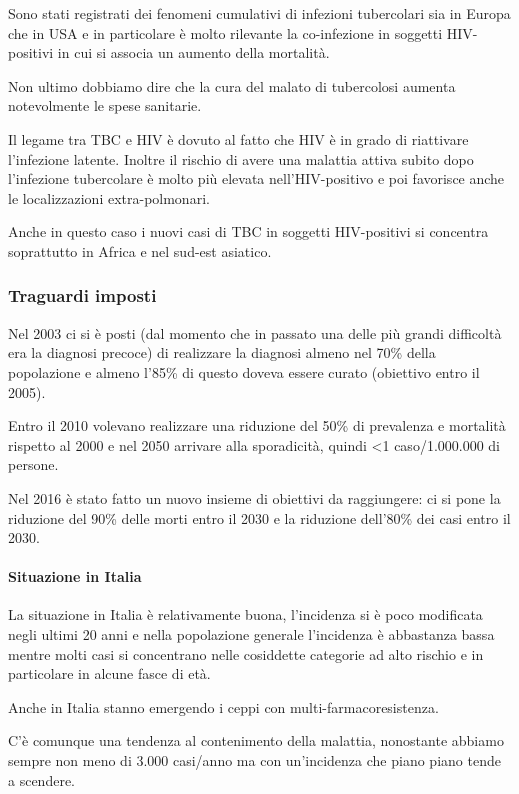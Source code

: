 Sono stati registrati dei fenomeni cumulativi di infezioni tubercolari
sia in Europa che in USA e in particolare è molto rilevante la
co-infezione in soggetti HIV-positivi in cui si associa un aumento della
mortalità.

Non ultimo dobbiamo dire che la cura del malato di tubercolosi aumenta
notevolmente le spese sanitarie.

Il legame tra TBC e HIV è dovuto al fatto che HIV è in grado di
riattivare l'infezione latente. Inoltre il rischio di avere una malattia
attiva subito dopo l'infezione tubercolare è molto più elevata
nell'HIV-positivo e poi favorisce anche le localizzazioni
extra-polmonari.

Anche in questo caso i nuovi casi di TBC in soggetti HIV-positivi si
concentra soprattutto in Africa e nel sud-est asiatico.

\subsubsection{Traguardi imposti}


Nel 2003 ci si è posti (dal momento che in passato una delle più grandi
difficoltà era la diagnosi precoce) di realizzare la diagnosi almeno nel
70\% della popolazione e almeno l'85\% di questo doveva essere curato
(obiettivo entro il 2005).

Entro il 2010 volevano realizzare una riduzione del 50\% di prevalenza e
mortalità rispetto al 2000 e nel 2050 arrivare alla sporadicità, quindi
\textless{}1 caso/1.000.000 di persone.

Nel 2016 è stato fatto un nuovo insieme di obiettivi da raggiungere: ci
si pone la riduzione del 90\% delle morti entro il 2030 e la riduzione
dell'80\% dei casi entro il 2030.

\paragraph{Situazione in Italia}

La situazione in Italia è relativamente buona, l'incidenza si è poco
modificata negli ultimi 20 anni e nella popolazione generale l'incidenza
è abbastanza bassa mentre molti casi si concentrano nelle cosiddette
categorie ad alto rischio e in particolare in alcune fasce di età.

Anche in Italia stanno emergendo i ceppi con multi-farmacoresistenza.

C'è comunque una tendenza al contenimento della malattia, nonostante
abbiamo sempre non meno di 3.000 casi/anno ma con un'incidenza che piano
piano tende a scendere.

